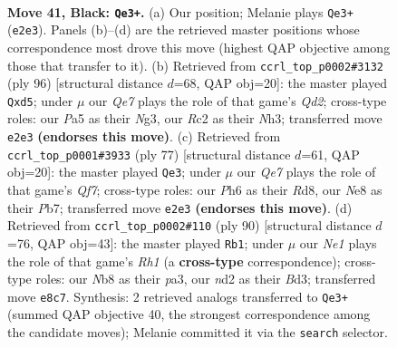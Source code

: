 \documentclass[11pt]{article}
\begin{document}
\clearpage

\begin{figure}[p]\centering
\begin{subfigure}{0.46\textwidth}\centering
\resizebox{\linewidth}{!}{%
\newchessgame
\chessboard[
  setfen={1n2nk2/7Q/7p/p4p1P/P7/7K/2rNq3/RN6 b - - 6 41},
  showmover=false,
  pgfstyle=straightmove, color=movearrow, markmove={e2-e3}
]}
\caption{}
\end{subfigure}\hfill
\begin{subfigure}{0.46\textwidth}\centering
\resizebox{\linewidth}{!}{%
\newchessgame
\chessboard[
  setfen={8/7n/4r1k1/3n2p1/1P6/2q2PNN/3Q2K1/8 w - - 0 49},
  showmover=false,
  pgfstyle=straightmove, color=movearrow, markmove={d2-d5}
]}
\caption{}
\end{subfigure}
\\[4pt]
\begin{subfigure}{0.46\textwidth}\centering
\resizebox{\linewidth}{!}{%
\newchessgame
\chessboard[
  setfen={1k1r4/1p6/p3N1RP/5p2/4p3/P4N2/2P1nq2/K3Q3 b - - 1 39},
  showmover=false,
  pgfstyle=straightmove, color=movearrow, markmove={f2-e3}
]}
\caption{}
\end{subfigure}\hfill
\begin{subfigure}{0.46\textwidth}\centering
\resizebox{\linewidth}{!}{%
\newchessgame
\chessboard[
  setfen={5k2/8/5nQ1/p2p2p1/3P1q2/p1rB1P2/6K1/7R w - - 2 46},
  showmover=false,
  pgfstyle=straightmove, color=movearrow, markmove={h1-b1}
]}
\caption{}
\end{subfigure}
\caption{\textbf{Move 41, Black: \texttt{Qe3+}.} (a) Our position; Melanie plays \texttt{Qe3+} (\texttt{e2e3}). Panels (b)--(d) are the retrieved master positions whose correspondence most drove this move (highest QAP objective among those that transfer to it). (b) Retrieved from \texttt{ccrl\_top\_p0002\#3132} (ply 96) [structural distance $d$=68, QAP obj=20]: the master played \texttt{Qxd5}; under $\mu$ our \emph{Qe7} plays the role of that game's \emph{Qd2}; cross-type roles: our \emph{P}a5 as their \emph{N}g3, our \emph{R}c2 as their \emph{N}h3; transferred move \texttt{e2e3} \textbf{(endorses this move)}. (c) Retrieved from \texttt{ccrl\_top\_p0001\#3933} (ply 77) [structural distance $d$=61, QAP obj=20]: the master played \texttt{Qe3}; under $\mu$ our \emph{Qe7} plays the role of that game's \emph{Qf7}; cross-type roles: our \emph{P}h6 as their \emph{R}d8, our \emph{N}e8 as their \emph{P}b7; transferred move \texttt{e2e3} \textbf{(endorses this move)}. (d) Retrieved from \texttt{ccrl\_top\_p0002\#110} (ply 90) [structural distance $d$=76, QAP obj=43]: the master played \texttt{Rb1}; under $\mu$ our \emph{Ne1} plays the role of that game's \emph{Rh1} (a \textbf{cross-type} correspondence); cross-type roles: our \emph{N}b8 as their \emph{p}a3, our \emph{n}d2 as their \emph{B}d3; transferred move \texttt{e8c7}. Synthesis: 2 retrieved analogs transferred to \texttt{Qe3+} (summed QAP objective 40, the strongest correspondence among the candidate moves); Melanie committed it via the \texttt{search} selector.}
\label{fig:thought-m81}
\end{figure}
\end{document}
